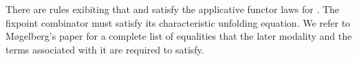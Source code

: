 \begin{AgdaAlign}
There are rules exibiting that  and  satisfy the applicative functor laws for . The fixpoint combinator  must satisfy its characteristic unfolding equation.
We refer to M{\o}gelberg's paper \cite{Mogelberg14} for a complete list of equalities that the later modality and the terms associated with it are required to satisfy.
\end{AgdaAlign}
